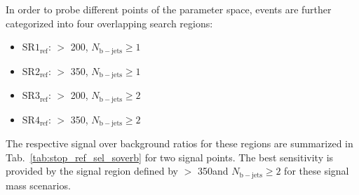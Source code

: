 In order to probe different points of the parameter space, events are further categorized into four overlapping search regions:
\begin{itemize}
 \item $\mathrm{SR1_{ref}}$: \met $>$ 200\gev, $N_\mathrm{b-jets} \ge 1$ 
 \item $\mathrm{SR2_{ref}}$: \met $>$ 350\gev, $N_\mathrm{b-jets} \ge 1$ 
 \item $\mathrm{SR3_{ref}}$: \met $>$ 200\gev, $N_\mathrm{b-jets} \ge 2$ 
 \item $\mathrm{SR4_{ref}}$: \met $>$ 350\gev, $N_\mathrm{b-jets} \ge 2$ 
\end{itemize}  
The respective signal over background ratios for these regions are summarized in Tab.~\ref{tab:stop_ref_sel_soverb} for two signal points. The best sensitivity is provided by the signal region defined by \met $>$ 350\gev and $N_\mathrm{b-jets} \ge 2$ for these signal mass scenarios. 
\begin{table}[!t]
\fontsize{9 pt}{1.2 em}
\selectfont
\centering
\caption{Signal over background ratios are displayed for two signal points labelled as (X, Y), where X is the stop quark mass and Y is the LSP mass in GeV, in the four search regions defined in SUS-13-015.}
\label{tab:stop_ref_sel_soverb}
\end{table}   
\\
